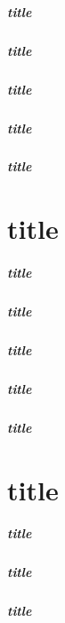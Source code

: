 \documentclass[a4paper,11pt]{book}
\begin{document}
	\paragraph{title}
	\paragraph{title}
	\paragraph{title}
	\paragraph{title}
	\paragraph{title}
	\chapter{title}
	\paragraph{title}
	\paragraph{title}
	\paragraph{title}
	\paragraph{title}
	\paragraph{title}
	\chapter{title}
	\paragraph{title}
	\paragraph{title}
	\paragraph{title}
\end{document}
